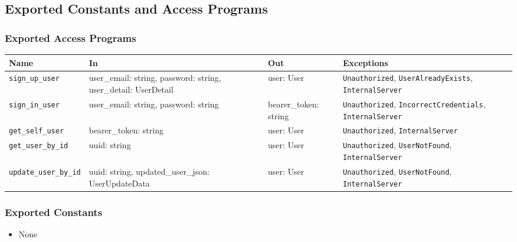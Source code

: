 \documentclass[12pt, titlepage]{article}
\begin{document}
\subsection{Exported Constants and Access Programs}
\subsubsection{Exported Access Programs}
\begin{center}
\small
\renewcommand{\arraystretch}{1.5}
\begin{tabular}{|p{3.5cm}|p{3.5cm}|p{2.5cm}|p{4cm}|}
    \hline
    \textbf{Name} & \textbf{In} & \textbf{Out} & \textbf{Exceptions} \\
    \hline 
    \texttt{sign\_up\_user} & user\_email: string, \newline password: string, \newline user\_detail: UserDetail & user: User & \texttt{Unauthorized}, \newline \texttt{UserAlreadyExists}, \newline \texttt{InternalServer} \\
    \hline
    \texttt{sign\_in\_user} & user\_email: string, \newline password: string & bearer\_token: string & \texttt{Unauthorized}, \newline \texttt{IncorrectCredentials}, \newline \texttt{InternalServer} \\
    \hline
    \texttt{get\_self\_user} & bearer\_token: string & user: User & \texttt{Unauthorized}, \newline \texttt{InternalServer} \\
    \hline
    \texttt{get\_user\_by\_id} & uuid: string & user: User & \texttt{Unauthorized}, \newline \texttt{UserNotFound}, \newline \texttt{InternalServer} \\
    \hline
    \texttt{update\_user\_by\_id} & uuid: string, \newline updated\_user\_json: UserUpdateData & user: User & \texttt{Unauthorized}, \newline \texttt{UserNotFound}, \newline \texttt{InternalServer} \\
    \hline
\end{tabular}
\end{center}

\subsubsection{Exported Constants}
\begin{itemize}
    \item None
\end{itemize}
\end{document}
